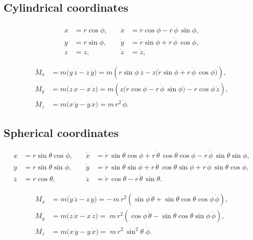 \subsection{Cylindrical coordinates}
\begin{equation}
\begin{aligned}
x &= r\cos\phi, 
&\quad
\dot x &= \dot r\cos\phi - r\,\dot\phi\,\sin\phi,\\
y &= r\sin\phi, 
&\quad
\dot y &= \dot r\sin\phi + r\,\dot\phi\,\cos\phi,\\
z &= z, 
&\quad
\dot z &= \dot z,
\end{aligned}
\end{equation}

\begin{equation}
\begin{aligned}
M_x &= m\bigl(y\,\dot z - z\,\dot y\bigr)
     = m\left(r\sin\phi\,\dot z
       - z\bigl(\dot r\sin\phi + r\,\dot\phi\,\cos\phi\bigr)\right),\\
M_y &= m\bigl(z\,\dot x - x\,\dot z\bigr)
     = m\left(z\bigl(\dot r\cos\phi - r\,\dot\phi\,\sin\phi\bigr)
       - r\cos\phi\,\dot z\right),\\
M_z &= m\bigl(x\,\dot y - y\,\dot x\bigr)
     = m\,r^2\,\dot\phi.
\end{aligned}
\end{equation}
\subsection{Spherical coordinates}
\begin{equation}
\begin{aligned}
x &= r\sin\theta\cos\phi,
&\quad
\dot x &= \dot r\,\sin\theta\cos\phi
          + r\,\dot\theta\,\cos\theta\cos\phi
          - r\,\dot\phi\,\sin\theta\sin\phi,\\
y &= r\sin\theta\sin\phi,
&\quad
\dot y &= \dot r\,\sin\theta\sin\phi
          + r\,\dot\theta\,\cos\theta\sin\phi
          + r\,\dot\phi\,\sin\theta\cos\phi,\\
z &= r\cos\theta,
&\quad
\dot z &= \dot r\,\cos\theta
          - r\,\dot\theta\,\sin\theta.
\end{aligned}
\end{equation}

\begin{equation}
\begin{aligned}
M_x &= m\bigl(y\,\dot z - z\,\dot y\bigr)
     = -\,m\,r^2\left(\sin\phi\,\dot\theta
       + \sin\theta\cos\theta\cos\phi\,\dot\phi\right),\\
M_y &= m\bigl(z\,\dot x - x\,\dot z\bigr)
     = \;m\,r^2\left(\cos\phi\,\dot\theta
       - \sin\theta\cos\theta\sin\phi\,\dot\phi\right),\\
M_z &= m\bigl(x\,\dot y - y\,\dot x\bigr)
     = \;m\,r^2\,\sin^2\theta\;\dot\phi.
\end{aligned}
\end{equation}

